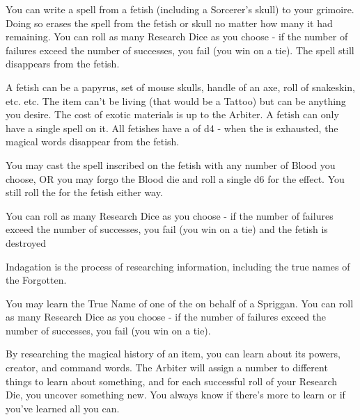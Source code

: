 {

You can write a spell from a fetish (including a Sorcerer's skull) to your grimoire.  Doing so erases the spell from the fetish or skull no matter how many \UD it had remaining.  You can roll as many Research Dice as you choose - if the number of failures exceed the number of successes, you fail (you win on a tie).  The spell still disappears from the fetish.


A fetish can be a papyrus, set of mouse skulls, handle of an axe, roll of snakeskin, etc. etc.  The item can't be living (that would be a Tattoo) but can be anything you desire.  The cost of exotic materials is up to the Arbiter. A fetish can only have a single spell on it.  All fetishes have a \UD of d4 - when the \UD is exhausted, the magical words disappear from the fetish. 

You may cast the spell inscribed on the fetish with any number of Blood you choose, OR you may forgo the Blood die and roll a single d6 for the effect.  You still roll the \UD for the fetish either way.

You can roll as many Research Dice as you choose - if the number of failures exceed the number of successes, you fail (you win on a tie) and the fetish is destroyed 



Indagation is the process of researching information, including the true names of the Forgotten.



You may learn the True Name of one of the  on behalf of a Spriggan.  You can roll as many Research Dice as you choose - if the number of failures exceed the number of successes, you fail (you win on a tie).


By researching the magical history of an item, you can learn about its powers, creator, and command words.  The Arbiter will assign a number to different things to learn about something, and for each successful roll of your Research Die, you uncover something new. You always know if there's more to learn or if you've learned all you can.

}
